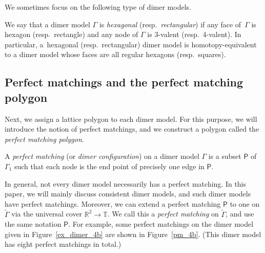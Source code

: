 \documentclass[11pt]{article}
\numberwithin{equation}{section}
\numberwithin{equation}{section}
\numberwithin{figure}{section}
\numberwithin{table}{section}
\newcommand{\RR}{\mathbb{R}}
\newcommand{\TT}{\mathbb{T}}
\newcommand{\sfP}{\mathsf{P}}
\begin{document}
We sometimes focus on the following type of dimer models.

\begin{Definition}\label{def_hexagonal_square}
We say that a dimer model $\Gamma$ is \emph{hexagonal} (resp.\ \emph{rectangular})
if any face of~$\Gamma$ is hexagon (resp.\ rectangle) and any node of $\Gamma$ is $3$-valent (resp.\ 4-valent).
In particular, a~hexagonal (resp.\ rectangular) dimer model is homotopy-equivalent to a dimer model whose faces are all regular hexagons (resp.\ squares).
\end{Definition}

\subsection{Perfect matchings and the perfect matching polygon}\label{subsection_PM}

Next, we assign a lattice polygon to each dimer model.
For this purpose, we will introduce the notion of perfect matchings, and we construct a polygon called the \emph{perfect matching polygon}.

\begin{Definition}A \emph{perfect matching} (or \emph{dimer configuration}) on a dimer model $\Gamma$ is a subset $\sfP$ of $\Gamma_1$ such that each node is
the end point of precisely one edge in $\sfP$.
\end{Definition}

In general, not every dimer model necessarily has a perfect matching.
In this paper, we will mainly discuss consistent dimer models, and such dimer models have perfect matchings.
Moreover, we can extend a perfect matching $\sfP$ to one on $\widetilde{\Gamma}$ via the universal cover $\RR^2\rightarrow\TT$.
We call this a \emph{perfect matching} on $\widetilde{\Gamma}$, and use the same notation $\sfP$.
For example, some perfect matchings on the dimer model given in Figure~\ref{ex_dimer_4b} are shown in Figure~\ref{pm_4b}.
(This dimer model has eight perfect matchings in total.)
\end{document}
